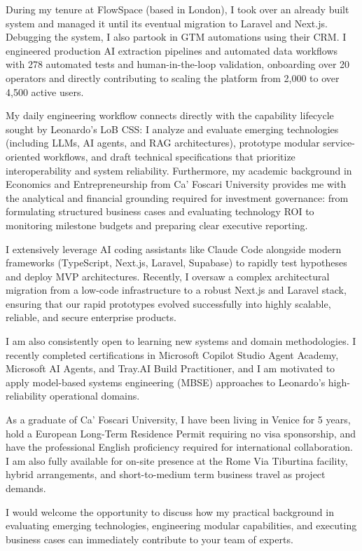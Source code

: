 \documentclass[11pt,a4paper]{article}
\begin{document}
During my tenure at FlowSpace (based in London), I took over an already built system and managed it until its eventual migration to Laravel and Next.js. Debugging the system, I also partook in GTM automations using their CRM. I engineered production AI extraction pipelines and automated data workflows with 278 automated tests and human-in-the-loop validation, onboarding over 20 operators and directly contributing to scaling the platform from 2,000 to over 4,500 active users.

My daily engineering workflow connects directly with the capability lifecycle sought by Leonardo's LoB CSS: I analyze and evaluate emerging technologies (including LLMs, AI agents, and RAG architectures), prototype modular service-oriented workflows, and draft technical specifications that prioritize interoperability and system reliability. Furthermore, my academic background in Economics and Entrepreneurship from Ca' Foscari University provides me with the analytical and financial grounding required for investment governance: from formulating structured business cases and evaluating technology ROI to monitoring milestone budgets and preparing clear executive reporting.

I extensively leverage AI coding assistants like Claude Code alongside modern frameworks (TypeScript, Next.js, Laravel, Supabase) to rapidly test hypotheses and deploy MVP architectures. Recently, I oversaw a complex architectural migration from a low-code infrastructure to a robust Next.js and Laravel stack, ensuring that our rapid prototypes evolved successfully into highly scalable, reliable, and secure enterprise products.

I am also consistently open to learning new systems and domain methodologies. I recently completed certifications in Microsoft Copilot Studio Agent Academy, Microsoft AI Agents, and Tray.AI Build Practitioner, and I am motivated to apply model-based systems engineering (MBSE) approaches to Leonardo's high-reliability operational domains.

As a graduate of Ca' Foscari University, I have been living in Venice for 5 years, hold a European Long-Term Residence Permit requiring no visa sponsorship, and have the professional English proficiency required for international collaboration. I am also fully available for on-site presence at the Rome Via Tiburtina facility, hybrid arrangements, and short-to-medium term business travel as project demands.

I would welcome the opportunity to discuss how my practical background in evaluating emerging technologies, engineering modular capabilities, and executing business cases can immediately contribute to your team of experts.
\end{document}
